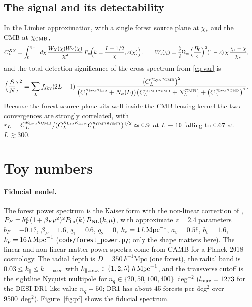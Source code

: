 \documentclass[11pt,a4paper]{article}
\newcommand{\kpar}{k_\parallel}
\newcommand{\kcmb}{\kappa_{\rm CMB}}
\newcommand{\klya}{\kappa_{{\rm Ly}\alpha}}
\begin{document}
\subsection{The signal and its detectability}
\label{sec:signal}

In the Limber approximation, with a single forest source plane at $\chi_*$ and the CMB at $\chi_{\rm CMB}$,
\begin{equation}
C_L^{XY}=\int_0^{\chi_{\min}}d\chi\,\frac{W_X(\chi)W_Y(\chi)}{\chi^2}\,P_{\rm m}\!\Big(k=\frac{L+1/2}{\chi},z(\chi)\Big),\qquad
W_s(\chi)=\frac32\Omega_{\rm m}\Big(\frac{H_0}{c}\Big)^2(1+z)\,\chi\,\frac{\chi_s-\chi}{\chi_s},
\label{eq:limber}
\end{equation}
and the total detection significance of the cross-spectrum from \eqref{eq:var} is
\begin{equation}
\Big(\frac{S}{N}\Big)^2=\sum_L f_{\rm sky}(2L+1)\,\frac{\big(C_L^{\klya\kcmb}\big)^2}{\big(C_L^{\klya\klya}+N_\kappa(L)\big)\big(C_L^{\kcmb\kcmb}+N_L^{\rm CMB}\big)+\big(C_L^{\klya\kcmb}\big)^2}.
\label{eq:snr}
\end{equation}
Because the forest source plane sits well inside the CMB lensing kernel the two convergences are strongly correlated, with $r_L=C^{\klya\kcmb}_L/(C^{\klya\klya}_LC^{\kcmb\kcmb}_L)^{1/2}\simeq0.9$ at $L=10$ falling to $0.67$ at $L\gtrsim300$.

\section{Toy numbers}
\label{sec:numbers}

\paragraph{Fiducial model.}
The forest power spectrum is the Kaiser form with the non-linear correction of \citet{1506.04519}, $P_F=b_F^2(1+\beta_F\mu^2)^2P_{\rm lin}(k)\,D_{\rm NL}(k,\mu)$, with approximate $z=2.4$ parameters $b_F=-0.13$, $\beta_F=1.6$, $q_1=0.6$, $q_2=0$, $k_v=1\,h\,{\rm Mpc}^{-1}$, $a_v=0.55$, $b_v=1.6$, $k_p=16\,h\,{\rm Mpc}^{-1}$ (\texttt{code/forest\_power.py}; only the shape matters here). The linear and non-linear matter power spectra come from CAMB for a Planck-2018 cosmology. The radial depth is $D=350\,h^{-1}$Mpc (one forest), the radial band is $0.03\le\kpar\le k_{\parallel,\max}$ with $k_{\parallel,\max}\in\{1,2,5\}\,h\,{\rm Mpc}^{-1}$, and the transverse cutoff is the sightline Nyquist multipole for $n_q\in\{20,50,100,400\}$~deg$^{-2}$ ($l_{\max}=1273$ for the DESI-DR1-like value $n_q=50$; DR1 has about 45 forests per deg$^2$ over 9500~deg$^2$). Figure~\ref{fig:pf} shows the fiducial spectrum.
\end{document}
